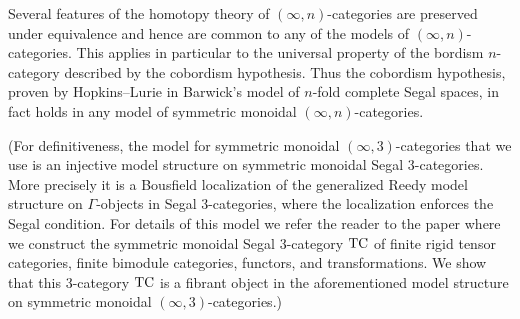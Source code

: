 \documentclass{amsart}
\begin{document}
Several features of the homotopy theory of $(\infty,n)$-categories are preserved under equivalence and hence are common to any of the models of $(\infty,n)$-categories. This applies in particular to the universal property of the bordism $n$-category described by the cobordism hypothesis. Thus the cobordism hypothesis, proven by Hopkins--Lurie \cite{Lurie_cobhyp} in Barwick's model of $n$-fold complete Segal spaces, in fact holds in any model of symmetric monoidal $(\infty,n)$-categories. 

(For definitiveness, the model for symmetric monoidal $(\infty,3)$-categories that we use is an injective model structure on symmetric monoidal Segal $3$-categories. 
More precisely it is a Bousfield localization of the generalized Reedy model structure on $\Gamma$-objects in Segal 3-categories, where the localization enforces the Segal condition.  For details of this model we refer the reader to the paper \cite{3TC} where we construct the  symmetric monoidal Segal 3-category $\mathrm{TC}$ of finite rigid tensor categories, finite bimodule categories, functors, and transformations. We show that this 3-category $\mathrm{TC}$ is a fibrant object in the aforementioned model structure on symmetric monoidal $(\infty,3)$-categories.) 




\end{document}
